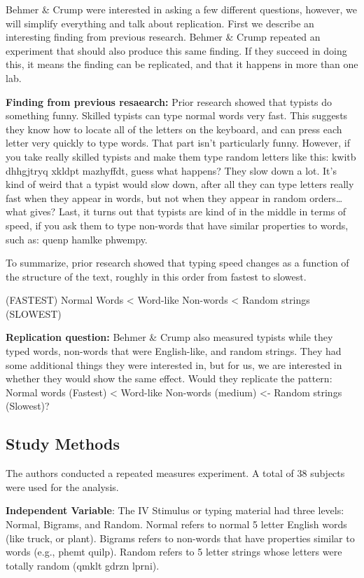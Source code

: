 \documentclass[]{book}
\theoremstyle{definition}
\theoremstyle{definition}
\theoremstyle{definition}
\theoremstyle{remark}
\begin{document}
Behmer \& Crump were interested in asking a few different questions,
however, we will simplify everything and talk about replication. First
we describe an interesting finding from previous research. Behmer \&
Crump repeated an experiment that should also produce this same finding.
If they succeed in doing this, it means the finding can be replicated,
and that it happens in more than one lab.

\textbf{Finding from previous resaearch:} Prior research showed that
typists do something funny. Skilled typists can type normal words very
fast. This suggests they know how to locate all of the letters on the
keyboard, and can press each letter very quickly to type words. That
part isn't particularly funny. However, if you take really skilled
typists and make them type random letters like this: kwitb dhhgjtryq
xkldpt mazhyffdt, guess what happens? They slow down a lot. It's kind of
weird that a typist would slow down, after all they can type letters
really fast when they appear in words, but not when they appear in
random orders\ldots{}what gives? Last, it turns out that typists are
kind of in the middle in terms of speed, if you ask them to type
non-words that have similar properties to words, such as: quenp hamlke
phwempy.

To summarize, prior research showed that typing speed changes as a
function of the structure of the text, roughly in this order from
fastest to slowest.

(FASTEST) Normal Words \textless{} Word-like Non-words \textless{}
Random strings (SLOWEST)

\textbf{Replication question:} Behmer \& Crump also measured typists
while they typed words, non-words that were English-like, and random
strings. They had some additional things they were interested in, but
for us, we are interested in whether they would show the same effect.
Would they replicate the pattern: Normal words (Fastest) \textless{}
Word-like Non-words (medium) \textless{}- Random strings (Slowest)?

\subsection{Study Methods}\label{study-methods-1}

The authors conducted a repeated measures experiment. A total of 38
subjects were used for the analysis.

\textbf{Independent Variable}: The IV Stimulus or typing material had
three levels: Normal, Bigrams, and Random. Normal refers to normal 5
letter English words (like truck, or plant). Bigrams refers to non-words
that have properties similar to words (e.g., phemt quilp). Random refers
to 5 letter strings whose letters were totally random (qmklt gdrzn
lprni).
\end{document}
